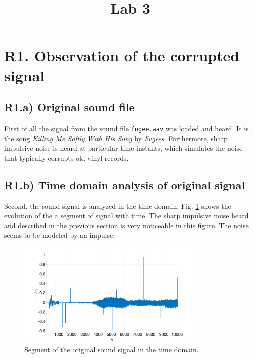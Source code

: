 \documentclass[]{scrartcl}
\title{Lab 3}
\author{}
\begin{document}
\maketitle

\begin{abstract}

\end{abstract}

\section{R1. Observation of the corrupted signal}\label{sec:R1}

\subsection{R1.a) Original sound file}
First of all the signal from the sound file \texttt{fugee.wav} was loaded and heard. It is the song \textit{Killing Me Softly With His Song} by \textit{Fugees}. Furthermore, sharp impulsive noise is heard at particular time instants, which simulates the noise that typically corrupts old vinyl records.

\subsection{R1.b) Time domain analysis of original signal}
Second, the sound signal is analyzed in the time domain. Fig. \ref{fig:R1b} shows the evolution of the a segment of signal with time. The sharp impulsive noise heard and described in the previous section is very noticeable in this figure. The noise seems to be modeled by an impulse.
\begin{figure}[htbp]
	\centering
	\includegraphics[width= 0.8\textwidth]{figures/R1b.png}
	\caption{Segment of the original sound signal in the time domain.}
	\label{fig:R1b}
\end{figure}
\end{document}
